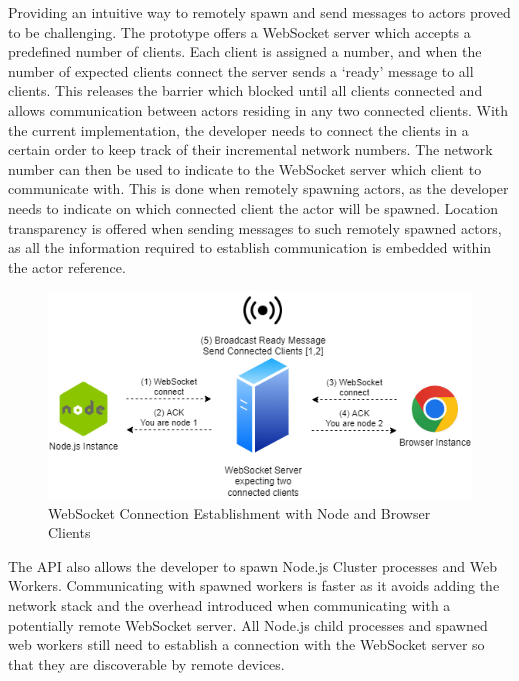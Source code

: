 \documentclass[12pt, a4paper]{report}
\theoremstyle{definition}
\theoremstyle{definition}%
\theoremstyle{definition}%
\theoremstyle{definition}%
\theoremstyle{definition}%
\theoremstyle{definition}%
\begin{document}
Providing an intuitive way to remotely spawn and send messages to actors proved to be challenging. The prototype offers a WebSocket server which accepts a predefined number of clients. Each client is assigned a number, and when the number of expected clients connect the server sends a ‘ready’ message to all clients. This releases the barrier which blocked until all clients connected and allows communication between actors residing in any two connected clients. With the current implementation, the developer needs to connect the clients in a certain order to keep track of their incremental network numbers. The network number can then be used to indicate to the WebSocket server which client to communicate with. This is done when remotely spawning actors, as the developer needs to indicate on which connected client the actor will be spawned. Location transparency is offered when sending messages to such remotely spawned actors, as all the information required to establish communication is embedded within the actor reference. 
\begin{figure}[H]
    \begin{centering}
        \includegraphics[width=\textwidth]{resources/websocketconnection.png}
        \caption{WebSocket Connection Establishment with Node and Browser Clients}
    \end{centering}
\end{figure}
The API also allows the developer to spawn Node.js Cluster processes and Web Workers. Communicating with spawned workers is faster as it avoids adding the network stack and the overhead introduced when communicating with a potentially remote WebSocket server. All Node.js child processes and spawned web workers still need to establish a connection with the WebSocket server so that they are discoverable by remote devices.
\end{document}
